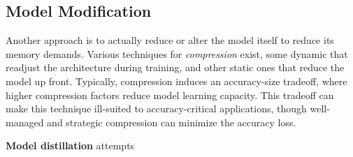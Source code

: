 \subsection{Model Modification}
Another approach is to actually reduce or alter the model itself to reduce its memory demands. Various techniques for \textit{compression} exist, some dynamic that readjust the architecture during training, and other static ones that reduce the model up front. Typically, compression induces an accuracy-size tradeoff, where higher compression factors reduce model learning capacity. This tradeoff can make this technique ill-suited to accuracy-critical applications, though well-managed and strategic compression can minimize the accuracy loss.

\textbf{Model distillation} attempts 


















